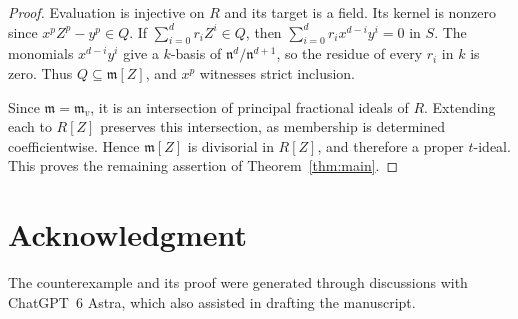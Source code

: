 \documentclass[11pt,reqno]{amsart}
\newcommand{\m}{\mathfrak m}
\newcommand{\n}{\mathfrak n}
\begin{document}
\begin{proof}
Evaluation is injective on \(R\) and its target is a field. Its kernel is
nonzero since \(x^pZ^p-y^p\in Q\). If \(\sum_{i=0}^{d}r_iZ^i\in Q\), then
\(\sum_{i=0}^{d}r_i x^{d-i}y^i=0\) in \(S\). The monomials
\(x^{d-i}y^i\) give a \(k\)-basis of \(\n^d/\n^{d+1}\), so the residue of
every \(r_i\) in \(k\) is zero. Thus \(Q\subseteq\m[Z]\), and \(x^p\)
witnesses strict inclusion.

Since \(\m=\m_v\), it is an intersection of principal fractional ideals
of \(R\). Extending each to \(R[Z]\) preserves this intersection, as
membership is determined coefficientwise. Hence \(\m[Z]\) is divisorial
in \(R[Z]\), and therefore a proper \(t\)-ideal. This proves the remaining
assertion of Theorem~\ref{thm:main}.
\end{proof}

\section*{Acknowledgment}
The counterexample and its proof were generated through discussions with
ChatGPT~6 Astra, which also assisted in drafting the manuscript.


\begingroup
\raggedright

\endgroup
\end{document}
